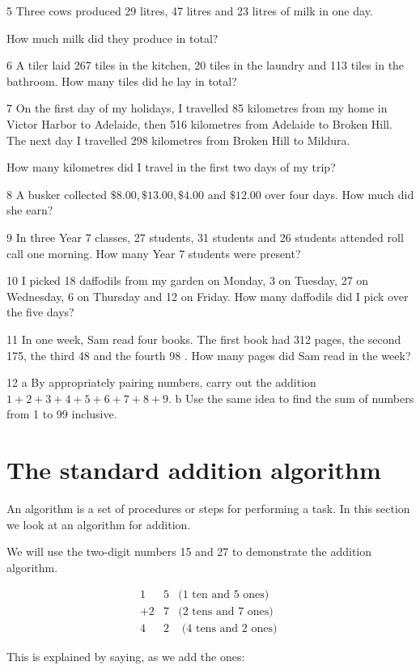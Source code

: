 \documentclass[10pt]{article}
\begin{document}
5 Three cows produced 29 litres, 47 litres and 23 litres of milk in one day.

How much milk did they produce in total?

6 A tiler laid 267 tiles in the kitchen, 20 tiles in the laundry and 113 tiles in the bathroom. How many tiles did he lay in total?

7 On the first day of my holidays, I travelled 85 kilometres from my home in Victor Harbor to Adelaide, then 516 kilometres from Adelaide to Broken Hill. The next day I travelled 298 kilometres from Broken Hill to Mildura.

How many kilometres did I travel in the first two days of my trip?

8 A busker collected \(\$ 8.00, \$ 13.00, \$ 4.00\) and \(\$ 12.00\) over four days. How much did she earn?

9 In three Year 7 classes, 27 students, 31 students and 26 students attended roll call one morning. How many Year 7 students were present?

10 I picked 18 daffodils from my garden on Monday, 3 on Tuesday, 27 on Wednesday, 6 on Thursday and 12 on Friday. How many daffodils did I pick over the five days?

11 In one week, Sam read four books. The first book had 312 pages, the second 175, the third 48 and the fourth 98 . How many pages did Sam read in the week?

12 a By appropriately pairing numbers, carry out the addition \(1+2+3+4+5+6+7+8+9\). b Use the same idea to find the sum of numbers from 1 to 99 inclusive.

\section*{The standard addition algorithm}
An algorithm is a set of procedures or steps for performing a task. In this section we look at an algorithm for addition.

We will use the two-digit numbers 15 and 27 to demonstrate the addition algorithm.

\[
\begin{array}{rrl}
1 & 5 & (1 \text { ten and } 5 \text { ones) } \\
+2 & 7 & (2 \text { tens and } 7 \text { ones) } \\
4 & 2 & \text { (4 tens and } 2 \text { ones) }
\end{array}
\]

This is explained by saying, as we add the ones:
\end{document}
